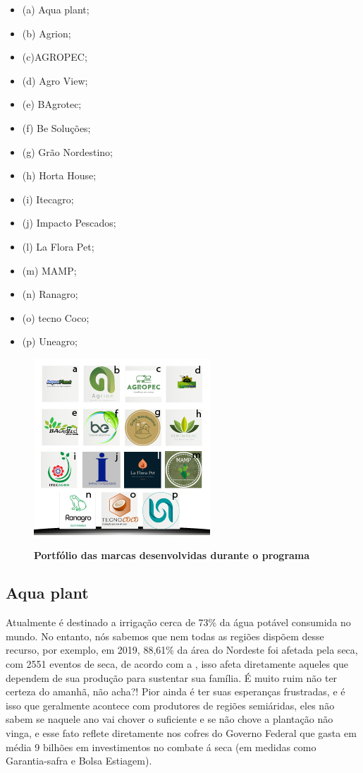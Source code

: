 \begin{multicols}{3}
\centering
    \begin{itemize}
\item {(a) Aqua plant;}
\item {(b) Agrion;}
\item {(c)AGROPEC;}
\item {(d) Agro View;}
\item {(e) BAgrotec;}
\item {(f) Be Soluções;}
\item {(g) Grão Nordestino;}
\item {(h) Horta House;}
\item {(i) Itecagro;}
\item {(j) Impacto Pescados;}
\item {(l) La Flora Pet;}
\item {(m) MAMP;}
\item {(n) Ranagro;}
\item {(o) tecno Coco;}
\item {(p) Uneagro;}
\end{itemize}
\end{multicols}

\begin{figure}[!htb]
\centering
\caption{\textbf{Portfólio das marcas desenvolvidas durante o programa}}
\includegraphics[scale=1.6]{Imagens/portfolio.png}
\label{figura_12}
\end{figure}

\newpage

\subsection{Aqua plant}


Atualmente é destinado a irrigação cerca de 73\% da água potável consumida no mundo.  No entanto, nós sabemos que nem todas as regiões dispõem desse recurso, por exemplo, em 2019, 88,61\% da área do Nordeste foi afetada pela seca, com 2551 eventos de seca, de acordo com a , isso afeta diretamente aqueles que dependem de sua produção para sustentar sua família. É muito ruim não ter certeza do amanhã, não acha?! Pior ainda é ter suas esperanças frustradas, e é isso  que geralmente acontece com produtores de regiões semiáridas, eles não sabem se naquele ano vai chover o suficiente e se não chove a plantação  não vinga, e esse fato reflete diretamente nos cofres do Governo Federal  que gasta em média 9 bilhões em investimentos no combate á seca (em medidas como Garantia-safra e Bolsa Estiagem).

